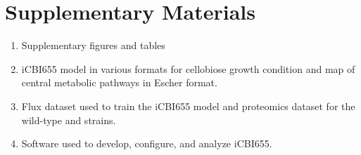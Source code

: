 \section*{Supplementary Materials}
\begin{enumerate}
    \item Supplementary figures and tables \label{sm:figures}
    \item iCBI655 model in various formats for cellobiose growth condition and map of central metabolic pathways in Escher format. \label{sm:model}
    \item Flux dataset used to train the iCBI655 model and proteomics dataset for the wild-type and  strains. \label{sm:datasets}
    \item Software used to develop, configure, and analyze iCBI655. \label{sm:code}
\end{enumerate}


